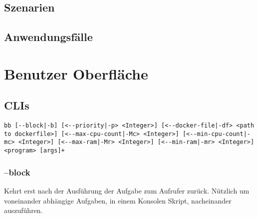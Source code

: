 \documentclass[parskip=full]{scrartcl}
\begin{document}
\subsection{Szenarien}

\subsection{Anwendungsfälle}

\section{Benutzer Oberfläche}
\subsection{\glspl{CLI}}
\begin{verbatim}
bb [--block|-b] [<--priority|-p> <Integer>] [<--docker-file|-df> <path to dockerfile>] [<--max-cpu-count|-Mc> <Integer>] [<--min-cpu-count|-mc> <Integer>] [<--max-ram|-Mr> <Integer>] [<--min-ram|-mr> <Integer>] <program> [args]+
\end{verbatim}

\subsubsection{--block}
Kehrt erst nach der Ausführung der Aufgabe zum Aufrufer zurück. Nützlich um voneinander abhängige Aufgaben, in einem Konsolen Skript, nacheinander auszuführen.

\printnoidxglossaries
\end{document}
